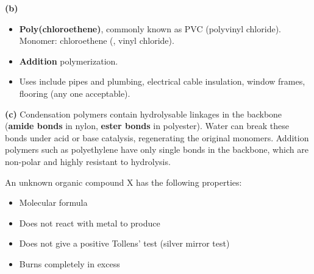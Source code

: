 \documentclass[addpoints]{exam}
\begin{document}
\begin{questions}
\begin{solution}[9cm]
\textbf{(b)}
\begin{itemize}
    \item[(i)] \textbf{Poly(chloroethene)}, commonly known as PVC (polyvinyl chloride).
    Monomer: chloroethene (, vinyl chloride).
    \item[(ii)] \textbf{Addition} polymerization.
    \item[(iii)] Uses include pipes and plumbing, electrical cable insulation, window frames,
    flooring (any one acceptable).
\end{itemize}

\textbf{(c)} Condensation polymers contain hydrolysable linkages in the backbone
(\textbf{amide bonds} in nylon, \textbf{ester bonds} in polyester). Water can break these bonds
under acid or base catalysis, regenerating the original monomers. Addition polymers such as
polyethylene have only  single bonds in the backbone, which are non-polar and highly
resistant to hydrolysis.
\end{solution}

\question An unknown organic compound X has the following properties:
\begin{itemize}
    \item Molecular formula 
    \item Does not react with  metal to produce 
    \item Does not give a positive Tollens' test (silver mirror test)
    \item Burns completely in excess 
\end{itemize}
\end{questions}
\end{document}
